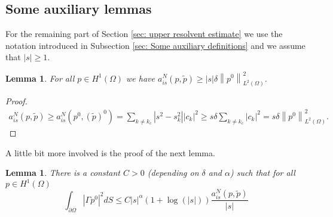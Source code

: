 \documentclass{amsart}
\newcommand{\abs}[1]{\left|#1\right|}
\newcommand{\norm}[1]{\left\| #1 \right\|}
\newcommand{\ptilde}{\tilde{p}}
\newtheorem{Lemma}[Theorem]{Lemma}
\begin{document}
\subsection{Some auxiliary lemmas}
For the remaining part of Section \ref{sec: upper resolvent estimate} we use the notation introduced in Subsection \ref{sec: Some auxiliary definitions} and we assume that $\abs{s}\geq 1$. 
\begin{Lemma}\label{thm: auxiliary lemma 1}
 For all $p\in H^1(\Omega)$ we have $a_{is}^N(p,\ptilde)\geq \abs{s}\delta\norm{p^0}_{L^2(\Omega)}^2$.
\end{Lemma}
\begin{proof}
 \begin{align*}
  a^N_{is}(p,\ptilde) \geq a^N_{is}(p^0,(\ptilde)^0) 
  = \sum_{k\neq k_c} \abs{s^2 - s_k^2} \abs{c_k}^2 
  \geq s\delta \sum_{k\neq k_c} \abs{c_k}^2 
  = s\delta \norm{p^0}_{L^2(\Omega)}^2 .
 \end{align*} 
\end{proof}
A little bit more involved is the proof of the next lemma.
\begin{Lemma}\label{thm: auxiliary lemma 2}
 There is a constant $C>0$ (depending on $\delta$ and $\alpha$) such that for all $p\in H^1(\Omega)$
 \begin{equation}\nonumber
  \int_{\partial\Omega} \abs{\Gamma p^0}^2 dS \leq C \abs{s}^{\alpha}(1+\log(\abs{s})) \frac{a^N_{is}(p,\ptilde)}{\abs{s}}
 \end{equation}
\end{Lemma}
\end{document}
